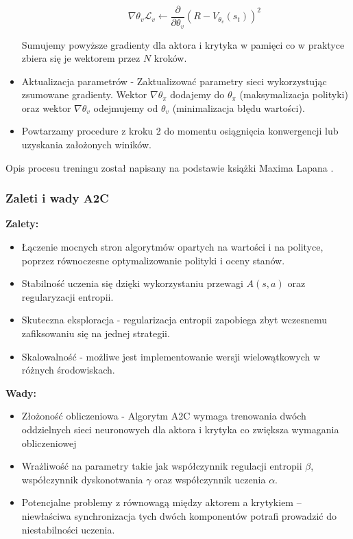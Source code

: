 \documentclass[a4paper, 12pt]{article}
\numberwithin{equation}{section}
\begin{document}
\begin{itemize}
\begin{itemize}
            \begin{equation}
            \nabla \theta_v \mathcal{L}_v \leftarrow \frac{\partial}{\partial \theta_v} (R - V_{\theta_v}(s_t))^2 
            \end{equation}
        \end{itemize}
        Sumujemy powyższe gradienty dla aktora i krytyka w pamięci co w praktyce zbiera się je wektorem przez \( N \) kroków.
        \item Aktualizacja parametrów - Zaktualizować parametry sieci wykorzystując zsumowane gradienty. Wektor \( \nabla \theta_\pi \) dodajemy do \( \theta_\pi \) (maksymalizacja polityki) oraz
        wektor \( \nabla \theta_v \) odejmujemy od \( \theta_v \) (minimalizacja błędu wartości).
        \item Powtarzamy procedure z kroku 2 do momentu osiągnięcia konwergencji lub uzyskania założonych winików.
    \end{itemize}
    Opis procesu treningu został napisany na podstawie książki Maxima Lapana \cite{lapan2020deep}.
    \subsubsection{Zaleti i wady A2C}
    \noindent \textbf{Zalety:}
    \begin{itemize}
        \item Łączenie mocnych stron algorytmów opartych na wartości i na polityce, poprzez równoczesne optymalizowanie polityki i oceny stanów.
        \item Stabilność uczenia się dzięki wykorzystaniu przewagi \( A(s,a) \) oraz regularyzacji entropii.
        \item Skuteczna eksploracja - regularizacja entropii zapobiega zbyt wczesnemu zafiksowaniu się na jednej strategii.
        \item Skalowalność - możliwe jest implementowanie wersji wielowątkowych w różnych środowiskach.
    \end{itemize}
    \textbf{Wady:}
    \begin{itemize}
        \item Złożoność obliczeniowa - Algorytm A2C wymaga trenowania dwóch oddzielnych sieci neuronowych dla aktora i krytyka co zwiększa
        wymagania obliczeniowej
        \item Wrażliwość na parametry takie jak współczynnik regulacji entropii \( \beta \), współczynnik dyskonotwania \( \gamma \) 
        oraz współczynnik uczenia \( \alpha \).
        \item Potencjalne problemy z równowagą między aktorem a krytykiem – niewłaściwa synchronizacja tych dwóch komponentów potrafi prowadzić do niestabilności uczenia.
    \end{itemize}
\end{document}
